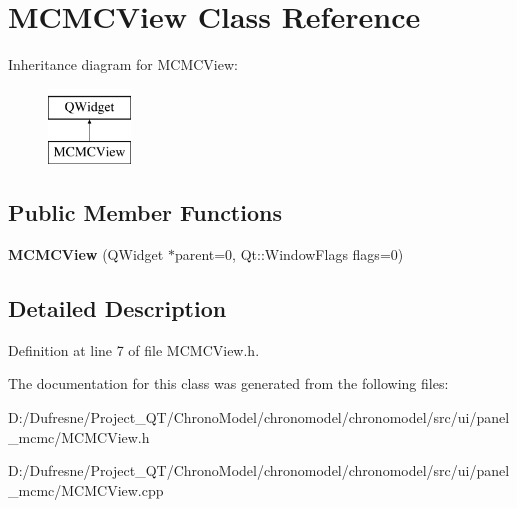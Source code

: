 \hypertarget{class_m_c_m_c_view}{\section{M\-C\-M\-C\-View Class Reference}
\label{class_m_c_m_c_view}
}
Inheritance diagram for M\-C\-M\-C\-View\-:\begin{figure}[H]
\begin{center}
\leavevmode
\includegraphics[height=2.000000cm]{class_m_c_m_c_view}
\end{center}
\end{figure}
\subsection*{Public Member Functions}
\begin{DoxyCompactItemize}
\item 
\hypertarget{class_m_c_m_c_view_acb924cf62a299f5ed3ddfdbde1bf4487}{{\bfseries M\-C\-M\-C\-View} (Q\-Widget $\ast$parent=0, Qt\-::\-Window\-Flags flags=0)}\label{class_m_c_m_c_view_acb924cf62a299f5ed3ddfdbde1bf4487}

\end{DoxyCompactItemize}


\subsection{Detailed Description}


Definition at line 7 of file M\-C\-M\-C\-View.\-h.



The documentation for this class was generated from the following files\-:\begin{DoxyCompactItemize}
\item 
D\-:/\-Dufresne/\-Project\-\_\-\-Q\-T/\-Chrono\-Model/chronomodel/chronomodel/src/ui/panel\-\_\-mcmc/M\-C\-M\-C\-View.\-h\item 
D\-:/\-Dufresne/\-Project\-\_\-\-Q\-T/\-Chrono\-Model/chronomodel/chronomodel/src/ui/panel\-\_\-mcmc/M\-C\-M\-C\-View.\-cpp\end{DoxyCompactItemize}
